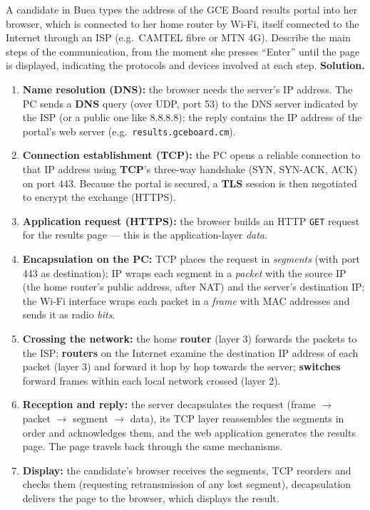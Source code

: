 \documentclass[11pt]{article}
\begin{document}
\begin{exoresolu}
A candidate in Buea types the address of the GCE Board results portal into her browser, which is connected to her home router by Wi-Fi, itself connected to the Internet through an ISP (e.g.\ CAMTEL fibre or MTN 4G). Describe the main steps of the communication, from the moment she presses ``Enter'' until the page is displayed, indicating the protocols and devices involved at each step.
\tcblower
\textbf{Solution.}
\begin{enumerate}
\item \textbf{Name resolution (DNS):} the browser needs the server's IP address. The PC sends a \textbf{DNS} query (over UDP, port 53) to the DNS server indicated by the ISP (or a public one like 8.8.8.8); the reply contains the IP address of the portal's web server (e.g.\ \texttt{results.gceboard.cm}).
\item \textbf{Connection establishment (TCP):} the PC opens a reliable connection to that IP address using \textbf{TCP}'s three-way handshake (SYN, SYN-ACK, ACK) on port 443. Because the portal is secured, a \textbf{TLS} session is then negotiated to encrypt the exchange (HTTPS).
\item \textbf{Application request (HTTPS):} the browser builds an HTTP \texttt{GET} request for the results page — this is the application-layer \emph{data}.
\item \textbf{Encapsulation on the PC:} TCP places the request in \emph{segments} (with port 443 as destination); IP wraps each segment in a \emph{packet} with the source IP (the home router's public address, after NAT) and the server's destination IP; the Wi-Fi interface wraps each packet in a \emph{frame} with MAC addresses and sends it as radio \emph{bits}.
\item \textbf{Crossing the network:} the home \textbf{router} (layer 3) forwards the packets to the ISP; \textbf{routers} on the Internet examine the destination IP address of each packet (layer 3) and forward it hop by hop towards the server; \textbf{switches} forward frames within each local network crossed (layer 2).
\item \textbf{Reception and reply:} the server decapsulates the request (frame $\rightarrow$ packet $\rightarrow$ segment $\rightarrow$ data), its TCP layer reassembles the segments in order and acknowledges them, and the web application generates the results page. The page travels back through the same mechanisms.
\item \textbf{Display:} the candidate's browser receives the segments, TCP reorders and checks them (requesting retransmission of any lost segment), decapsulation delivers the page to the browser, which displays the result.

\end{enumerate}
\end{exoresolu}
\end{document}
